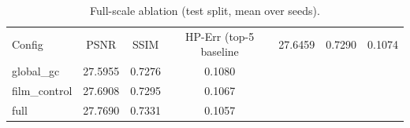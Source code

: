 \begin{table}[t]
\centering\caption{Full-scale ablation (test split, mean over seeds).}\label{tab:ablation}
\begin{tabular}{lccc}
\hline
Config & PSNR & SSIM & HP-Err (top-5%
\hline
baseline & 27.6459 & 0.7290 & 0.1074 \\
global_gc & 27.5955 & 0.7276 & 0.1080 \\
film_control & 27.6908 & 0.7295 & 0.1067 \\
full & 27.7690 & 0.7331 & 0.1057 \\
\hline
\end{tabular}
\end{table}